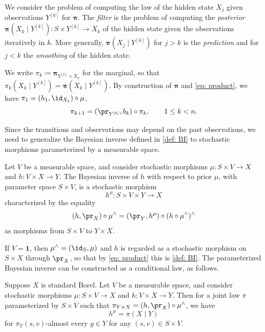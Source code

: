 \documentclass[12pt,reqno]{amsart}%
\theoremstyle{plain}
\theoremstyle{definition}
\def\bspi{\boldsymbol{\pi}}
\def\bsone{\boldsymbol{1}}
\begin{document}
We consider the problem of computing the law of the hidden state $X_j$ given observations $Y^{[k]}$
for $\bspi$.
The \emph{filter} is the problem of computing the \emph{posterior}
$\bspi(X_k\mid Y^{[k]})\colon S\times Y^{[k]}\rightarrow X_k$ of the hidden state given the
observations iteratively in $k$. More generally, $\bspi(X_j\mid Y^{[k]})$ for $j>k$ is the \emph{prediction} and
for $j<k$ the \emph{smoothing} of the hidden state.

We write $\pi_k\coloneqq\bspi_{Y^{[k]}\times X_k}$ for the marginal, so that $\pi_k(X_k\mid Y^{[k]})=\bspi(X_k\mid Y^{[k]})$.
By construction of $\bspi$ and \eqref{eq: product}, we have $\pi_1=(h_1,\id_{X_1})\circ\mu$,
\begin{equation}\label{eq: recursion}
	\pi_{k+1}=(\pr_{Y^{[k]}},b_k)\circ \pi_{k},\qquad 1\leq k<n.
\end{equation}

Since the transitions and observations may depend on the past observations,
we need to generalize the Bayesian inverse defined in \cref{def: BI} to stochastic morphisms parameterized by a measurable space.

\begin{definition}\label{def: BI V}
	Let $V$ be a measurable space, and
	consider stochastic morphisms $\mu\colon S\times V\rightarrow X$ and $h\colon V\times X\rightarrow Y$.
	The Bayesian inverse of $h$ with respect to prior $\mu$, with parameter space $S\times V$,
	is a stochastic morphism
	\[
		h^\mu\colon S\times V\times Y\rightarrow X
	\]
	characterized by the equality
	\begin{equation}\label{eq: BI V}
			(h,\pr_X)\circ\mu^\wedge=(\pr_Y,h^\mu)\circ (h\circ\mu^\wedge)^\wedge
	\end{equation}
	as morphisms from $S\times V$ to $Y\times X$.
\end{definition}

If $V=\bsone$, then $\mu^\wedge=(\id_S,\mu)$ and $h$ is regarded as a stochastic morphism on $S\times X$ through $\pr_X$,
so that by \eqref{eq: product} this is \cref{def: BI}.
The parameterized Bayesian inverse can be constructed as a conditional law, as follows.

\begin{proposition}\label{prop: construct V}
	Suppose $X$ is standard Borel.
	Let $V$ be a measurable space, and
	consider stochastic morphisms $\mu\colon S\times V\rightarrow X$ and $h\colon V\times X\rightarrow Y$.
	Then for a joint law $\pi$ parameterized by 
	$S\times V$ such that $\pi_{Y\times X}=(h,\pr_X)\circ\mu^\wedge$,
	we have
	\[
		h^\mu=\pi(X\mid Y)
	\]
	for $\pi_Y(s,v)$-almost every $y\in Y$ for any $(s,v)\in S\times V$.
\end{proposition}
\end{document}
